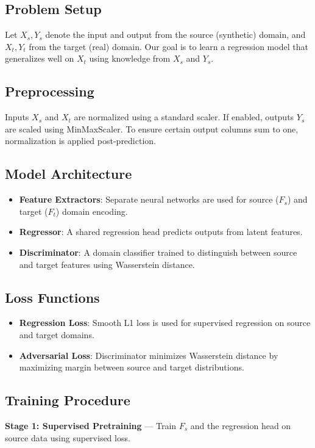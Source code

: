 \documentclass{article}
\begin{document}
\subsection{Problem Setup}
Let $X_s, Y_s$ denote the input and output from the source (synthetic) domain, and $X_t, Y_t$ from the target (real) domain. Our goal is to learn a regression model that generalizes well on $X_t$ using knowledge from $X_s$ and $Y_s$.

\subsection{Preprocessing}
Inputs $X_s$ and $X_t$ are normalized using a standard scaler. If enabled, outputs $Y_s$ are scaled using MinMaxScaler. To ensure certain output columns sum to one, normalization is applied post-prediction.

\subsection{Model Architecture}
\begin{itemize}
  \item \textbf{Feature Extractors}: Separate neural networks are used for source ($F_s$) and target ($F_t$) domain encoding.
  \item \textbf{Regressor}: A shared regression head predicts outputs from latent features.
  \item \textbf{Discriminator}: A domain classifier trained to distinguish between source and target features using Wasserstein distance.
\end{itemize}

\subsection{Loss Functions}
\begin{itemize}
  \item \textbf{Regression Loss}: Smooth L1 loss is used for supervised regression on source and target domains.
  \item \textbf{Adversarial Loss}: Discriminator minimizes Wasserstein distance by maximizing margin between source and target distributions.
\end{itemize}

\subsection{Training Procedure}
\textbf{Stage 1: Supervised Pretraining} — Train $F_s$ and the regression head on source data using supervised loss.
\end{document}
